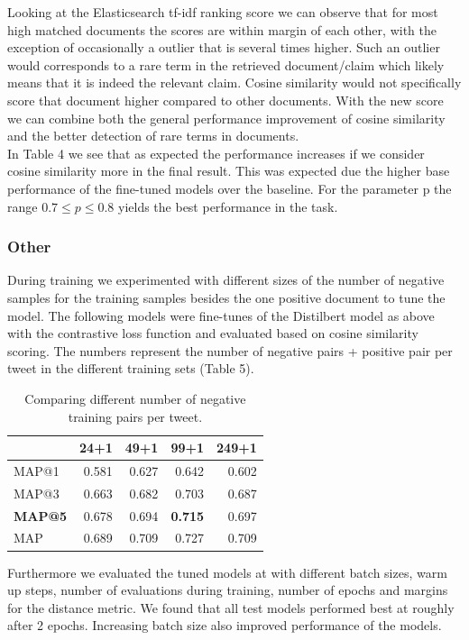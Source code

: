 \documentclass{article}
\begin{document}
Looking at the Elasticsearch tf-idf ranking score we can observe that for most high matched documents the scores are within margin of each other, with the exception of occasionally a outlier that is several times higher.
Such an outlier would corresponds to a rare term in the retrieved document/claim which likely means that it is indeed the relevant claim. 
Cosine similarity would not specifically score that document higher compared to other documents.
With the new score we can combine both the general performance improvement of cosine similarity and the better detection of rare terms in documents.\\
In Table 4 we see that as expected the performance increases if we consider cosine similarity more in the final result.
This was expected due the higher base performance of the fine-tuned models over the baseline. 
For the parameter p the range $0.7\leqslant p \leqslant0.8$ yields the best performance in the task.
\subsubsection{Other} 
During training we experimented with different sizes of the number of negative samples for the training samples besides the one positive document to tune the model.
The following models were fine-tunes of the Distilbert model as above with the contrastive loss function and evaluated based on cosine similarity scoring.
The numbers represent the number of negative pairs + positive pair per tweet in the different training sets (Table 5).
\begin{table}[H]
\centering
\begin{threeparttable}
    \begin{tabular}{lrrrr}
        \toprule
         				& 24+1 & 49+1 & 99+1 & 249+1 \\ \midrule
        MAP@1 		& 0.581 & 0.627 & 0.642 & 0.602 \\
	 MAP@3			& 0.663 & 0.682 & 0.703 &0.687 \\
        \textbf{MAP@5} & 0.678 &0.694 &\textbf{ 0.715} & 0.697 \\
        MAP 			& 0.689 	& 0.709 & 0.727 & 0.709  \\ \bottomrule
   \end{tabular}
\caption{Comparing different number of negative training pairs per tweet.}
\end{threeparttable}
\end{table}
\noindent Furthermore we evaluated the tuned models at with different batch sizes, warm up steps, number of evaluations during training, number of epochs and margins for the distance metric.
We found that all test models performed best at roughly after 2 epochs.
Increasing batch size also improved performance of the models.
\end{document}
